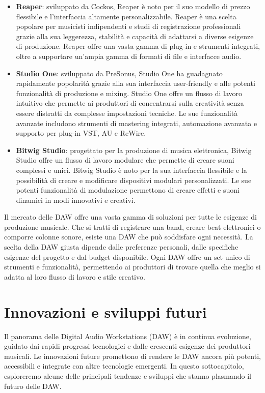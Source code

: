 \documentclass{book}
\begin{document}
\begin{itemize}
\item \textbf{Reaper}: sviluppato da Cockos, Reaper è noto per il suo modello di prezzo flessibile e l’interfaccia altamente personalizzabile. Reaper è una scelta popolare per musicisti indipendenti e studi di registrazione professionali grazie alla sua leggerezza, stabilità e capacità di adattarsi a diverse esigenze di produzione. Reaper offre una vasta gamma di plug-in e strumenti integrati, oltre a supportare un’ampia gamma di formati di file e interfacce audio.
\item \textbf{Studio One}: sviluppato da PreSonus, Studio One ha guadagnato rapidamente popolarità grazie alla sua interfaccia user-friendly e alle potenti funzionalità di produzione e mixing. Studio One offre un flusso di lavoro intuitivo che permette ai produttori di concentrarsi sulla creatività senza essere distratti da complesse impostazioni tecniche. Le sue funzionalità avanzate includono strumenti di mastering integrati, automazione avanzata e supporto per plug-in VST, AU e ReWire.
\item \textbf{Bitwig Studio}: progettato per la produzione di musica elettronica, Bitwig Studio offre un flusso di lavoro modulare che permette di creare suoni complessi e unici. Bitwig Studio è noto per la sua interfaccia flessibile e la possibilità di creare e modificare dispositivi modulari personalizzati. Le sue potenti funzionalità di modulazione permettono di creare effetti e suoni dinamici in modi innovativi e creativi.
\end{itemize}

Il mercato delle DAW offre una vasta gamma di soluzioni per tutte le esigenze di produzione musicale. Che si tratti di registrare una band, creare beat elettronici o comporre colonne sonore, esiste una DAW che può soddisfare ogni necessità. La scelta della DAW giusta dipende dalle preferenze personali, dalle specifiche esigenze del progetto e dal budget disponibile. Ogni DAW offre un set unico di strumenti e funzionalità, permettendo ai produttori di trovare quella che meglio si adatta al loro flusso di lavoro e stile creativo.

\section{Innovazioni e sviluppi futuri}

Il panorama delle Digital Audio Workstations (DAW) è in continua evoluzione, guidato dai rapidi progressi tecnologici e dalle crescenti esigenze dei produttori musicali. Le innovazioni future promettono di rendere le DAW ancora più potenti, accessibili e integrate con altre tecnologie emergenti. In questo sottocapitolo, esploreremo alcune delle principali tendenze e sviluppi che stanno plasmando il futuro delle DAW.
\end{document}
